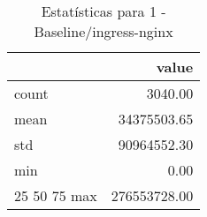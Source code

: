 \begin{table}[htbp]
\caption{Estatísticas para 1 - Baseline/ingress-nginx}
\label{tab:1_-_baseline_ingress-nginx_summary}
\begin{tabular}{lr}
\toprule
 & value \\
\midrule
count & 3040.00 \\
mean & 34375503.65 \\
std & 90964552.30 \\
min & 0.00 \\
25%
50%
75%
max & 276553728.00 \\
\bottomrule
\end{tabular}
\end{table}
